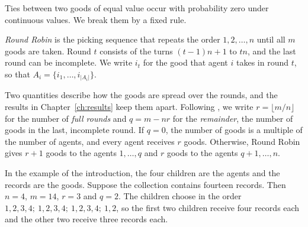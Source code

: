 Ties between two goods of equal value occur with probability zero under continuous values. We
break them by a fixed rule.

\begin{definition}
\textit{Round Robin} is the picking sequence that repeats the order $1,2,\dots,n$ until all $m$
goods are taken. Round $t$ consists of the turns $(t-1)n+1$ to $tn$, and the last round can be
incomplete. We write $i_t$ for the good that agent $i$ takes in round $t$, so that
$A_i=\{i_1,\dots,i_{|A_i|}\}$.
\end{definition}

Two quantities describe how the goods are spread over the rounds, and the results in
Chapter~\ref{ch:results} keep them apart. Following
\textcite[p.~16]{manurangsi2021}, we write $r=\lfloor m/n\rfloor$ for the number of \textit{full
rounds} and $q=m-nr$ for the \textit{remainder}, the number of goods in the last, incomplete round.
If $q=0$, the number of goods is a multiple of the number of agents, and every agent receives $r$
goods. Otherwise, Round Robin gives $r+1$ goods to the agents $1,\dots,q$ and $r$ goods to the
agents $q+1,\dots,n$.

\begin{example}\label{ex:records}
In the example of the introduction, the four children are the agents and the records are the
goods. Suppose the collection contains fourteen records. Then $n=4$, $m=14$, $r=3$ and $q=2$. The
children choose in the order $1,2,3,4;\ 1,2,3,4;\ 1,2,3,4;\ 1,2$, so the first two children
receive four records each and the other two receive three records each.
\end{example}


